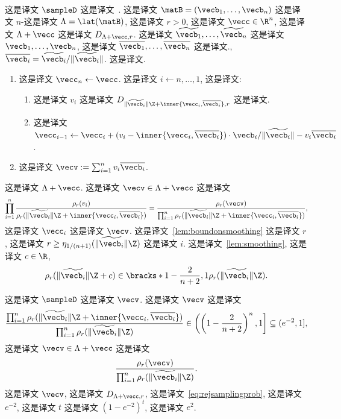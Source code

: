 这是译文 $\sampleD$ 这是译文~\cite{DBLP:conf/stoc/GentryPV08}. 这是译文 $\matB=(\vecb_1,\ldots,\vecb_n)$ 这是译文 $n$-这是译文 $\Lambda=\lat(\matB)$, 这是译文 $r>0$,  这是译文 $\vecc \in \R^n$, 这是译文 $\Lambda+\vecc$ 这是译文  $D_{\Lambda+\vecc,r}$. 这是译文 $\widetilde{\vecb_1},\ldots,\widetilde{\vecb_n}$ 这是译文 $\vecb_1,\ldots,\vecb_n$, 这是译文 $\overline{\vecb_1},\ldots,\overline{\vecb_n}$ 这是译文., $\overline{\vecb_i} = \widetilde{\vecb_i}/\|\widetilde{\vecb_i}\|$. 这是译文. 

\begin{enumerate}
\item 这是译文 $\vecc_n \leftarrow \vecc$. 这是译文 $i \leftarrow n,\ldots,1$, 这是译文:
\begin{enumerate}
	\item 这是译文 $v_i$ 这是译文 $D_{\|\widetilde{\vecb_i}\| \Z+\inner{\vecc_i,\overline{\vecb_i}}, r}$ 这是译文.
	\item 这是译文 $\vecc_{i-1} \leftarrow \vecc_i + (v_i - \inner{\vecc_i, \overline{\vecb_i}}) \cdot \vecb_i / \|\widetilde{\vecb_i}\| - v_i \overline{\vecb_i}$.
\end{enumerate}	
\item 这是译文 $\vecv := \sum_{i=1}^n v_i \overline{\vecb_i}$.
\end{enumerate}

这是译文 $\Lambda+\vecc$. 这是译文 $\vecv \in \Lambda+\vecc$ 这是译文  \[
\prod_{i=1}^n \frac{\rho_r(v_i)}{\rho_r(\|\widetilde{\vecb_i}\| \Z + \inner{\vecc_i,\overline{\vecb_i}})} = 
\frac{\rho_r(\vecv)}{\prod_{i=1}^n \rho_r(\|\widetilde{\vecb_i}\| \Z + \inner{\vecc_i,\overline{\vecb_i}})},
\] 这是译文 $\vecc_i$ 这是译文 $\vecv$. 这是译文~\ref{lem:boundonsmoothing} 这是译文 $r$,  这是译文 $r \ge \eta_{1/(n+1)}(\|\widetilde{\vecb_i}\| \Z)$ 这是译文 $i$. 这是译文~\ref{lem:smoothing}, 这是译文 $c \in \R$, \begin{equation*}%
\rho_r(\|\widetilde{\vecb_i}\| \Z + c) \in \bracks*{1-\frac{2}{n+2},1} \rho_r(\|\widetilde{\vecb_i}\| \Z).
\end{equation*}

这是译文 $\sampleD$ 这是译文 $\vecv$. 这是译文 $\vecv$ 这是译文  \begin{equation}\label{eq:rejsamplingprob}
\frac{\prod_{i=1}^n \rho_r(\|\widetilde{\vecb_i}\| \Z + \inner{\vecc_i,\overline{\vecb_i}})}
{\prod_{i=1}^n \rho_r(\|\widetilde{\vecb_i}\| \Z)} \in \left( \left(1-\frac{2}{n+2}\right)^n,1 \right] \subseteq (e^{-2},1],
\end{equation} 这是译文 $\vecv \in \Lambda+\vecc$ 这是译文  \[
\frac{\rho_r(\vecv)}{\prod_{i=1}^n \rho_r(\|\widetilde{\vecb_i}\| \Z )}.
\] 这是译文 $\vecv$, 这是译文 $D_{\Lambda+\vecc,r}$, 这是译文~\eqref{eq:rejsamplingprob},  这是译文 $e^{-2}$, 这是译文 $t$ 这是译文 $(1-e^{-2})^t$, 这是译文 $e^{2}$.

